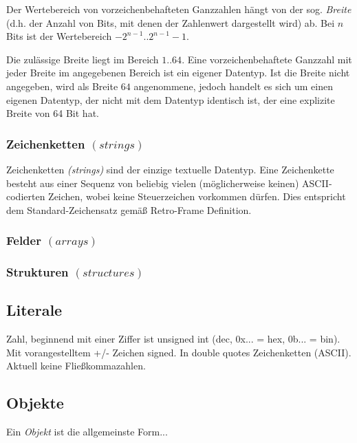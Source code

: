 \documentclass{scrartcl}
\begin{document}
\vspace{10pt}
\noindent Der Wertebereich von vorzeichenbehafteten Ganzzahlen hängt von der sog. \textit{Breite} (d.h. der Anzahl von Bits, mit denen der Zahlenwert dargestellt wird) ab. Bei $n$ Bits ist der Wertebereich $-2^{n-1}..2^{n-1} - 1$.

\vspace{10pt}
\noindent Die zulässige Breite liegt im Bereich $1..64$. Eine vorzeichenbehaftete Ganzzahl mit jeder Breite im angegebenen Bereich ist ein eigener Datentyp. Ist die Breite nicht angegeben, wird als Breite $64$ angenommene, jedoch handelt es sich um einen eigenen Datentyp, der nicht mit dem Datentyp identisch ist, der eine explizite Breite von 64 Bit hat.

\subsubsection{Zeichenketten $(strings)$}

\noindent Zeichenketten \textit{(strings)} sind der einzige textuelle Datentyp. Eine Zeichenkette besteht aus einer Sequenz von beliebig vielen (möglicherweise keinen) ASCII-codierten Zeichen, wobei keine Steuerzeichen vorkommen dürfen. Dies entspricht dem Standard-Zeichensatz gemäß Retro-Frame Definition.

\subsubsection{Felder $(arrays)$}

\subsubsection{Strukturen $(structures)$}

\subsection{Literale}

\noindent Zahl, beginnend mit einer Ziffer ist unsigned int (dec, 0x... = hex, 0b... = bin). Mit vorangestelltem +/- Zeichen signed. In double quotes Zeichenketten (ASCII). Aktuell keine Fließkommazahlen.

\subsection{Objekte}

\noindent Ein \textit{Objekt} ist die allgemeinste Form...
\end{document}
